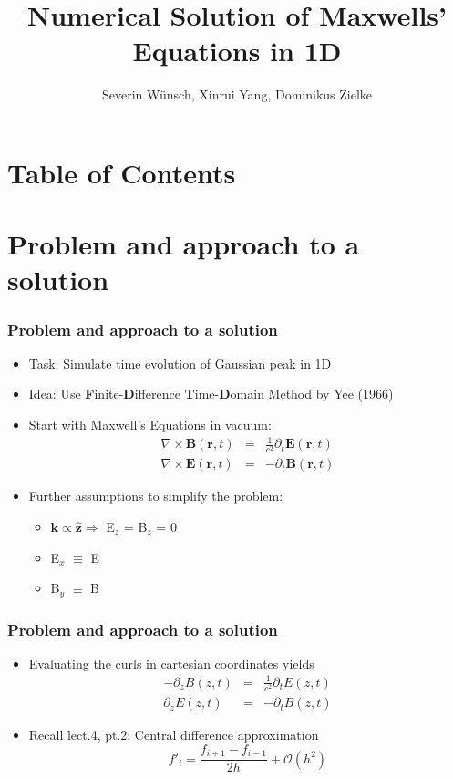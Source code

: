 \documentclass[ignorenonframetext]{beamer}
\title[]{Numerical Solution of Maxwells' Equations in 1D}
\subtitle{}
\author[Wünsch, Yang, Zielke]{\large{Severin Wünsch, Xinrui Yang, Dominikus Zielke} \\
}
\institute[Universität Augsburg]{Institut für Physik der Universität Augsburg}
\date[29.07.2016]
\begin{document}
\frame[plain]{\titlepage}

\section*{Table of Contents}
\begin{frame}
\tableofcontents[]
\end{frame}

\section{Problem and approach to a solution}
\begin{frame}
\frametitle{Problem and approach to a solution}
\begin{itemize}
\item Task: Simulate time evolution of Gaussian peak in 1D
\item Idea: Use \textbf{F}inite-\textbf{D}ifference \textbf{T}ime-\textbf{D}omain Method by Yee (1966)
\item Start with Maxwell's Equations in vacuum:
\begin{eqnarray}
\nabla \times \boldsymbol{B}(\boldsymbol{r},t) &=& \frac{1}{c^2}\partial_t{\boldsymbol{E}}(\boldsymbol{r},t)\nonumber\\
\nabla \times \boldsymbol{E}(\boldsymbol{r},t) &=& -\partial_t{\boldsymbol{B}}(\boldsymbol{r}, t)
\end{eqnarray}
\item Further assumptions to simplify the problem:
\begin{itemize}
\item $\boldsymbol{k} \propto \hat{\boldsymbol{z}} \Rightarrow $ E$_z$ = B$_z$ = 0   
\item E$_x$ $\equiv$ E 
\item B$_y$ $\equiv$ B
\end{itemize}
\end{itemize}
\end{frame}

\begin{frame}
\frametitle{Problem and approach to a solution}
\begin{itemize}
\item Evaluating the curls in cartesian coordinates yields
\begin{eqnarray}
-\partial_z B(z, t) &=& \frac{1}{c^2} \partial_t E(z, t)\nonumber\\
\partial_z E(z, t)  &=& -\partial_t B(z, t)
\end{eqnarray}
\item Recall lect.4, pt.2: Central difference approximation
\begin{equation}
f'_i = \frac{f_{i+1} - f_{i-1}}{2h} + \mathcal{O}(h^2) 
\end{equation}
\end{itemize}
\end{frame}
\end{document}
